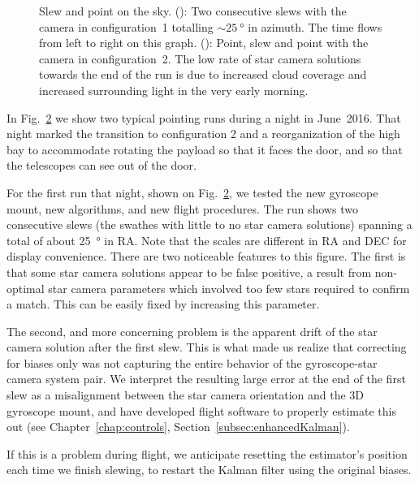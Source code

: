 \begin{landscape}
\begin{figure}[!h]
\begin{subfigure}[b]{0.7\textwidth}
		\caption{}
		\label{subfig:SlewWithStarcam2}
\end{subfigure}
\caption[Slew and point on the sky]{Slew and point on the sky. (): Two consecutive slews with the camera in configuration~1 totalling $\sim\SI{25}{\degree}$ in azimuth. The time flows from left to right on this graph. (): Point, slew and point with the camera in configuration~2. The low rate of star camera solutions towards the end of the run is due to increased cloud coverage and increased surrounding light in the very early morning.}
\label{fig:SlewWithStarcam}
\end{figure}
\end{landscape}

In Fig.~\ref{fig:SlewWithStarcam} we show two typical pointing runs during a night in June~2016. That night marked the transition to configuration 2 and a reorganization of the high bay to accommodate rotating the payload so that it faces the door, and so that the telescopes can see out of the door.

For the first run that night, shown on Fig.~\ref{fig:SlewWithStarcam}, we tested the new gyroscope mount, new algorithms, and new flight procedures. The run shows two consecutive slews (the swathes with little to no star camera solutions) spanning a total of about \SI{25}{\degree} in RA. Note that the scales are different in RA and DEC for display convenience. There are two noticeable features to this figure. The first is that some star camera solutions appear to be false positive, a result from non-optimal star camera parameters which involved too few stars required to confirm a match. This can be easily fixed by increasing this parameter.

The second, and more concerning problem is the apparent drift of the star camera solution after the first slew. This is what made us realize that correcting for biases only was not capturing the entire behavior of the gyroscope-star camera system pair. We interpret the resulting large error at the end of the first slew as a misalignment between the star camera orientation and the 3D gyroscope mount, and have developed flight software to properly estimate this out (see Chapter~\ref{chap:controls}, Section~\ref{subsec:enhancedKalman}).

If this is a problem during flight, we anticipate resetting the estimator's position each time we finish slewing, to restart the Kalman filter using the original biases.

